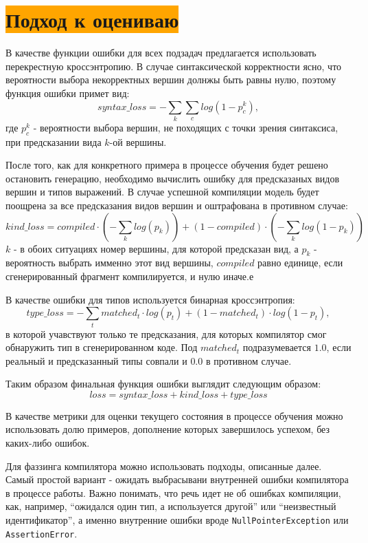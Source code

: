 \documentclass[times,specification,annotation]{itmo-student-thesis}
\begin{document}
\section{\colorbox{orange}{Подход к оцениваю}}\label{rate}
В качестве функции ошибки для всех подзадач предлагается использовать перекрестную кроссэнтропию. В случае синтаксической корректности ясно, что вероятности выбора некорректных вершин долнжы быть равны нулю, поэтому функция ошибки примет вид:
    \[
        syntax\_loss = -\sum_k \sum_c log (1 - p^k_c),
    \]
где $p^k_c$ - вероятности выбора вершин, не походящих с точки зрения синтаксиса, при предсказании вида $k$-ой вершины.

После того, как для конкретного примера в процессе обучения будет решено остановить генерацию, необходимо вычислить ошибку для предсказаных видов вершин и типов выражений. В случае успешной компиляции модель будет поощрена за все предсказания видов вершин и оштрафована в противном случае:
    \[
        kind\_loss = compiled \cdot (-\sum_k log (p_k)) + (1 - compiled) \cdot (-\sum_k log (1 - p_k))
    \]
$k$ - в обоих ситуациях номер вершины, для которой предсказан вид, а $p_k$ - вероятность выбрать имменно этот вид вершины, $compiled$ равно единице, если сгенерированный фрагмент компилируется, и нулю иначе.е

В качестве ошибки для типов используется бинарная кроссэнтропия:
    \[
        type\_loss = -\sum_t matched_t \cdot log (p_t) + (1 - matched_t) \cdot log (1 - p_t),
    \]
в которой учавствуют только те предсказания, для которых компилятор смог обнаружить тип в сгенерированном коде. Под $matched_t$ подразумевается $1.0$, если реальный и предсказанный типы совпали и $0.0$ в противном случае.

Таким образом финальная функция ошибки выглядит следующим образом:
    \[
        loss = syntax\_loss + kind\_loss + type\_loss
    \]

В качестве метрики для оценки текущего состояния в процессе обучения можно использовать долю примеров, дополнение которых завершилось успехом, без каких-либо ошибок.

Для фаззинга компилятора можно использовать подходы, описанные далее. Самый простой вариант - ожидать выбрасывани внутренней ошибки компилятора в процессе работы. Важно понимать, что речь идет не об ошибках компиляции, как, например, ``ожидался один тип, а используется другой'' или ``неизвестный идентификатор'', а именно внутренние ошибки вроде \texttt{NullPointerException} или \texttt{AssertionError}.
\end{document}
